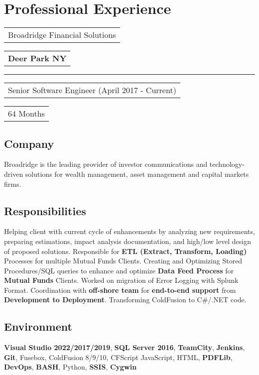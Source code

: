 \documentclass[letterpaper,11pt]{article}
\begin{document}
\section{Professional Experience}


    \vspace{0.64cm}
    \noindent
    \begin{tabular}[t]{@{}l}
    \Large{Broadridge Financial Solutions}
    \end{tabular}
    \hfill
    \begin{tabular}[t]{l@{}}
    \textbf{Deer Park NY}
    \end{tabular}
    \noindent\rule{\textwidth}{0.5pt}
    \begin{tabular}[t]{@{}l}
    Senior Software Engineer (April 2017 - Current)
    \end{tabular}
    \hfill
    \begin{tabular}[t]{l@{}}
    64 Months
    \end{tabular}

    \subsection{Company}
    Broadridge is the leading provider of investor communications and technology-driven solutions for wealth management, asset management and capital markets firms.

    \subsection{Responsibilities}
    Helping client with current cycle of enhancements by analyzing new requirements, preparing estimations, impact analysis documentation, and high/low level design of proposed solutions. Responsible for \textbf{ETL (Extract, Transform, Loading)} Processes for multiple Mutual Funds Clients. Creating and Optimizing Stored Procedures/SQL queries to enhance and optimize \textbf{Data Feed Process} for \textbf{Mutual Funds} Clients. Worked on migration of Error Logging with Splunk Format. Coordination with \textbf{off-shore team} for \textbf{end-to-end support} from \textbf{Development to Deployment}. Transforming ColdFusion to C\#/.NET code.

    \subsection{Environment}
    \textbf{Visual Studio 2022/2017/2019}, \textbf{SQL Server 2016}, \textbf{TeamCity}, \textbf{Jenkins}, \textbf{Git}, Fusebox,  ColdFusion 8/9/10, CFScript JavaScript, HTML, \textbf{PDFLib}, \textbf{DevOps}, \textbf{BASH}, Python, \textbf{SSIS}, \textbf{Cygwin}
\end{document}
